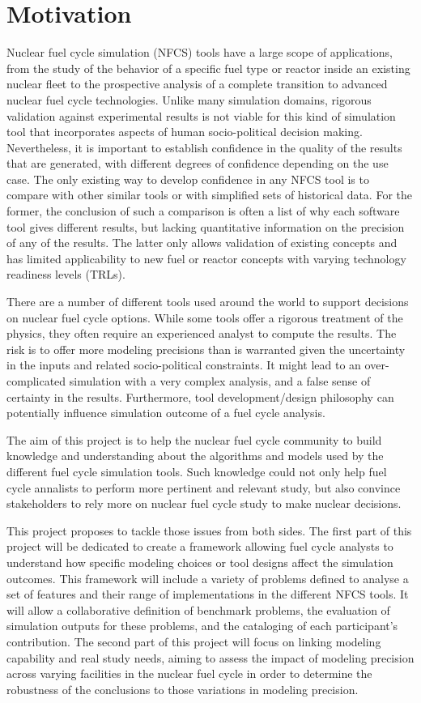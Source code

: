 
\section{Motivation}
Nuclear fuel cycle simulation (NFCS) tools have a large scope of applications,
from the study of the behavior of a specific fuel type or reactor inside an
existing nuclear fleet to the prospective analysis of a complete transition to
advanced nuclear fuel cycle technologies. Unlike many simulation domains,
rigorous validation against experimental results is not viable for this kind of
simulation tool that incorporates aspects of human socio-political decision
making.  Nevertheless, it is important to establish confidence in the quality of
the results that are generated, with different degrees of confidence depending
on the use case.  The only existing way to develop confidence in any NFCS tool
is to compare with other similar tools or with simplified sets of historical
data. For the former, the conclusion of such a comparison is often a list of why
each software tool gives different results, but lacking quantitative information
on the precision of any of the results. The latter only allows validation of
existing concepts and has limited applicability to new fuel or reactor concepts
with varying technology readiness levels (TRLs).

There are a number of different tools used around the world to support decisions
on nuclear fuel cycle options.  While some tools offer a rigorous treatment of
the physics, they often require an experienced analyst to compute the results.
The risk is to offer more modeling precisions than is warranted given the
uncertainty in the inputs and related socio-political constraints. It might lead
to an over-complicated simulation with a very complex analysis, and a false
sense of certainty in the results. Furthermore, tool development/design
philosophy can potentially influence simulation outcome of a fuel cycle
analysis.

The aim of this project is to help the nuclear fuel cycle community to build
knowledge and understanding about the algorithms and models used by the
different fuel cycle simulation tools. Such knowledge could not only help fuel
cycle annalists to perform more pertinent and relevant study, but also convince
stakeholders to rely more on nuclear fuel cycle study to make nuclear decisions.


This project proposes to tackle those issues from both sides. The first part of
this project will be dedicated to create a framework allowing fuel cycle
analysts to understand how specific modeling choices or tool designs affect the
simulation outcomes. This framework will include a variety of problems defined
to analyse a set of features and their range of implementations in the different
NFCS tools. It will allow a collaborative definition of benchmark problems, the
evaluation of simulation outputs for these problems, and the cataloging of each
participant’s contribution.
The second part of this project will focus on linking modeling capability and
real study needs, aiming to assess the impact of modeling precision across
varying facilities in the nuclear fuel cycle in order to determine the
robustness of the conclusions to those variations in modeling precision. 



